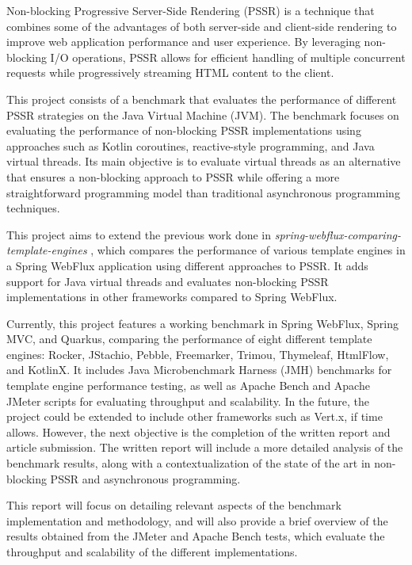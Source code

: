 \documentclass[../ppG48.tex]{subfiles}
\begin{document}
Non-blocking Progressive Server-Side Rendering (PSSR) is a technique that combines some of the advantages of both server-side and client-side rendering to improve web application performance and user experience. By leveraging non-blocking I/O operations, PSSR allows for efficient handling of multiple concurrent requests while progressively streaming HTML content to the client.

This project consists of a benchmark that evaluates the performance of different PSSR strategies on the Java Virtual Machine (JVM). The benchmark focuses on evaluating the performance of non-blocking PSSR implementations using approaches such as Kotlin coroutines, reactive-style programming, and Java virtual threads. Its main objective is to evaluate virtual threads as an alternative that ensures a non-blocking approach to PSSR while offering a more straightforward programming model than traditional asynchronous programming techniques.

This project aims to extend the previous work done in \textit{spring-webflux-comparing-template-engines} \cite{spring-webflux-comparing-template-engines}, which compares the performance of various template engines in a Spring WebFlux application using different approaches to PSSR. It adds support for Java virtual threads and evaluates non-blocking PSSR implementations in other frameworks compared to Spring WebFlux.

Currently, this project features a working benchmark in Spring WebFlux, Spring MVC, and Quarkus, comparing the performance of eight different template engines: Rocker, JStachio, Pebble, Freemarker, Trimou, Thymeleaf, HtmlFlow, and KotlinX. It includes Java Microbenchmark Harness (JMH) benchmarks for template engine performance testing, as well as Apache Bench and Apache JMeter scripts for evaluating throughput and scalability. In the future, the project could be extended to include other frameworks such as Vert.x, if time allows. However, the next objective is the completion of the written report and article submission. The written report will include a more detailed analysis of the benchmark results, along with a contextualization of the state of the art in non-blocking PSSR and asynchronous programming.

This report will focus on detailing relevant aspects of the benchmark implementation and methodology, and will also provide a brief overview of the results obtained from the JMeter and Apache Bench tests, which evaluate the throughput and scalability of the different implementations.
\end{document}

